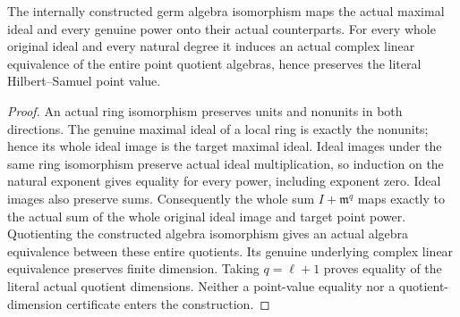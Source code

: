 \begin{lemma}
\label{hir:actual-nonlinear-full-quotient-hilbert-samuel-invariance}
\leanok
{}
The internally constructed germ algebra isomorphism maps the actual maximal
ideal and every genuine power onto their actual counterparts. For every
whole original ideal and every natural degree it induces an actual complex
linear equivalence of the entire point quotient algebras, hence preserves
the literal Hilbert--Samuel point value.
\end{lemma}
\begin{proof}
An actual ring isomorphism preserves units and nonunits in both directions.
The genuine maximal ideal of a local ring is exactly the nonunits; hence
its whole ideal image is the target maximal ideal. Ideal images under the
same ring isomorphism preserve actual ideal multiplication, so induction
on the natural exponent gives equality for every power, including exponent
zero. Ideal images also preserve sums. Consequently the whole sum
$I+\mathfrak m^q$ maps exactly to the actual sum of the whole original ideal
image and target point power. Quotienting the constructed algebra
isomorphism gives an actual algebra equivalence between these entire
quotients. Its genuine underlying complex linear equivalence preserves
finite dimension. Taking $q=\ell+1$ proves equality of the literal actual
quotient dimensions. Neither a point-value equality nor a quotient-dimension
certificate enters the construction.
\end{proof}

